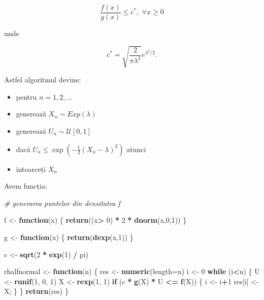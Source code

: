 \documentclass[]{article}
\newenvironment{Shaded}{\begin{snugshade}}{\end{snugshade}}
\newcommand{\KeywordTok}[1]{\textcolor[rgb]{0.13,0.29,0.53}{\textbf{#1}}}
\newcommand{\DataTypeTok}[1]{\textcolor[rgb]{0.13,0.29,0.53}{#1}}
\newcommand{\DecValTok}[1]{\textcolor[rgb]{0.00,0.00,0.81}{#1}}
\newcommand{\StringTok}[1]{\textcolor[rgb]{0.31,0.60,0.02}{#1}}
\newcommand{\CommentTok}[1]{\textcolor[rgb]{0.56,0.35,0.01}{\textit{#1}}}
\newcommand{\ControlFlowTok}[1]{\textcolor[rgb]{0.13,0.29,0.53}{\textbf{#1}}}
\newcommand{\OperatorTok}[1]{\textcolor[rgb]{0.81,0.36,0.00}{\textbf{#1}}}
\newcommand{\NormalTok}[1]{#1}
\begin{document}
\[
    \frac{f(x)}{g(x)}\leq c^*, \,\,\forall x \geq0
\]

unde

\[
  c^*=\sqrt{\frac{2}{\pi\lambda^2}}e^{\lambda^2/2}.
\]

Astfel algoritmul devine:

\begin{itemize}
\item
  pentru \(n=1,2,\dots\)
\item
  generează \(X_n\sim Exp(\lambda)\)
\item
  generează \(U_n\sim\mathcal{U}[0,1]\)
\item
  dacă \(U_n\leq\exp\left(-\frac{1}{2}(X_n-\lambda)^2\right)\) atunci
\item
  intoarceți \(X_n\)
\end{itemize}

Avem funcția:

\begin{Shaded}
\begin{Highlighting}[]
\CommentTok{# generarea puntelor din densitatea f}

\NormalTok{f <-}\StringTok{ }\ControlFlowTok{function}\NormalTok{(x) \{}
  \KeywordTok{return}\NormalTok{((x}\OperatorTok{>}\StringTok{ }\DecValTok{0}\NormalTok{) }\OperatorTok{*}\StringTok{ }\DecValTok{2} \OperatorTok{*}\StringTok{ }\KeywordTok{dnorm}\NormalTok{(x,}\DecValTok{0}\NormalTok{,}\DecValTok{1}\NormalTok{))}
\NormalTok{\}}

\NormalTok{g <-}\StringTok{ }\ControlFlowTok{function}\NormalTok{(x) \{ }\KeywordTok{return}\NormalTok{(}\KeywordTok{dexp}\NormalTok{(x,}\DecValTok{1}\NormalTok{)) \}}

\NormalTok{c <-}\StringTok{ }\KeywordTok{sqrt}\NormalTok{(}\DecValTok{2} \OperatorTok{*}\StringTok{ }\KeywordTok{exp}\NormalTok{(}\DecValTok{1}\NormalTok{) }\OperatorTok{/}\StringTok{ }\NormalTok{pi)}

\NormalTok{rhalfnormal <-}\StringTok{ }\ControlFlowTok{function}\NormalTok{(n) \{}
\NormalTok{  res <-}\StringTok{ }\KeywordTok{numeric}\NormalTok{(}\DataTypeTok{length=}\NormalTok{n)}
\NormalTok{  i <-}\StringTok{ }\DecValTok{0}
  \ControlFlowTok{while}\NormalTok{ (i}\OperatorTok{<}\NormalTok{n) \{}
\NormalTok{    U <-}\StringTok{ }\KeywordTok{runif}\NormalTok{(}\DecValTok{1}\NormalTok{, }\DecValTok{0}\NormalTok{, }\DecValTok{1}\NormalTok{)}
\NormalTok{    X <-}\StringTok{ }\KeywordTok{rexp}\NormalTok{(}\DecValTok{1}\NormalTok{, }\DecValTok{1}\NormalTok{)}
    \ControlFlowTok{if}\NormalTok{ (c }\OperatorTok{*}\StringTok{ }\KeywordTok{g}\NormalTok{(X) }\OperatorTok{*}\StringTok{ }\NormalTok{U }\OperatorTok{<=}\StringTok{ }\KeywordTok{f}\NormalTok{(X)) \{}
\NormalTok{      i <-}\StringTok{ }\NormalTok{i}\OperatorTok{+}\DecValTok{1}
\NormalTok{      res[i] <-}\StringTok{ }\NormalTok{X;}
\NormalTok{    \}}
\NormalTok{  \}}
  \KeywordTok{return}\NormalTok{(res)}
\NormalTok{\}}
\end{Highlighting}
\end{Shaded}
\end{document}
